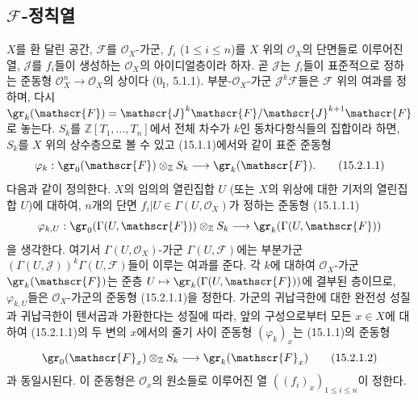 \subsection{\texorpdfstring{$\mathscr{F}$}{F}-정칙열}
\label{subsection:0.15.2-fr}

\begin{env}[15.2.1]
\label{0.15.2.1-fr}
$X$를 환 달린 공간, $\mathscr{F}$를 $\mathcal{O}_X$-가군,
$f_i$ ($1\leq i\leq n$)를 $X$ 위의 $\mathcal{O}_X$의 단면들로
이루어진 열, $\mathscr{J}$를 $f_i$들이 생성하는 $\mathcal{O}_X$의
아이디얼층이라 하자. 곧 $\mathscr{J}$는 $f_i$들이 표준적으로 정하는
준동형 $\mathcal{O}_X^n\to\mathcal{O}_X$의 상이다
($0_{\mathrm I}$, 5.1.1). 부분-$\mathcal{O}_X$-가군
$\mathscr{J}^k\mathscr{F}$들은 $\mathscr{F}$ 위의 여과를 정하며, 다시
$\gr_k(\mathscr{F})=\mathscr{J}^k\mathscr{F}/
\mathscr{J}^{k+1}\mathscr{F}$로 놓는다. $S_k$를
$\mathbb{Z}[T_1,\ldots,T_n]$에서 전체 차수가 $k$인 동차다항식들의
집합이라 하면, $S_k$를 $X$ 위의 상수층으로 볼 수 있고 (15.1.1)에서와
같이 표준 준동형
\[
\label{0.15.2.1.1-fr}
  \varphi_k:\gr_0(\mathscr{F})\otimes_{\mathbb Z}S_k
  \longrightarrow\gr_k(\mathscr{F}).
\tag{15.2.1.1}
\]
다음과 같이 정의한다. $X$의 임의의 열린집합 $U$ (또는 $X$의
위상에 대한 기저의 열린집합
$U$)에 대하여, $n$개의 단면
$f_i|U\in\Gamma(U,\mathcal{O}_X)$가 정하는 준동형 (15.1.1.1)
\[
  \varphi_{k,U}:\gr_0(\Gamma(U,\mathscr{F}))\otimes_{\mathbb Z}S_k
  \longrightarrow\gr_k(\Gamma(U,\mathscr{F}))
\]
을 생각한다. 여기서 $\Gamma(U,\mathcal{O}_X)$-가군
$\Gamma(U,\mathscr{F})$에는 부분가군
$(\Gamma(U,\mathscr{J}))^k\Gamma(U,\mathscr{F})$들이 이루는 여과를
준다. 각 $k$에 대하여 $\mathcal{O}_X$-가군
$\gr_k(\mathscr{F})$는 준층
$U\mapsto\gr_k(\Gamma(U,\mathscr{F}))$에 결부된 층이므로,
$\varphi_{k,U}$들은 $\mathcal{O}_X$-가군의 준동형 (15.2.1.1)을
정한다. 가군의 귀납극한에 대한 완전성 성질과 귀납극한이 텐서곱과
가환한다는 성질에 따라, 앞의 구성으로부터 모든 $x\in X$에 대하여
(15.2.1.1)의 두 변의 $x$에서의 줄기 사이 준동형
$(\varphi_k)_x$는 (15.1.1)의 준동형
\[
\label{0.15.2.1.2-fr}
  \gr_0(\mathscr{F}_x)\otimes_{\mathbb Z}S_k
  \longrightarrow\gr_k(\mathscr{F}_x)
\tag{15.2.1.2}
\]
과 동일시된다. 이 준동형은 $\mathcal{O}_x$의 원소들로 이루어진 열
$((f_i)_x)_{1\leq i\leq n}$이 정한다.
\end{env}

